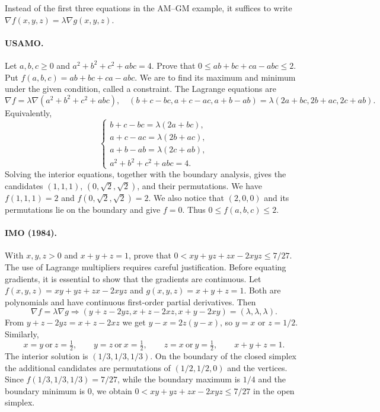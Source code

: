 \documentclass[11pt,a4paper]{article}
\begin{document}
Instead of the first three equations in the AM--GM example, it suffices to write
$\nabla f(x,y,z)=\lambda\nabla g(x,y,z)$.
\paragraph{USAMO.}
Let $a,b,c\geq0$ and $a^2+b^2+c^2+abc=4$. Prove that $0\leq ab+bc+ca-abc\leq2$.
Put $f(a,b,c)=ab+bc+ca-abc$. We are to find its maximum and minimum under the given condition, called a constraint.
The Lagrange equations are
\[
\nabla f=\lambda\nabla(a^2+b^2+c^2+abc),
\quad (b+c-bc,a+c-ac,a+b-ab)=\lambda(2a+bc,2b+ac,2c+ab).
\]
Equivalently,
\[
\begin{cases}
b+c-bc=\lambda(2a+bc),\\
a+c-ac=\lambda(2b+ac),\\
a+b-ab=\lambda(2c+ab),\\
a^2+b^2+c^2+abc=4.
\end{cases}
\]
Solving the interior equations, together with the boundary analysis, gives
the candidates $(1,1,1)$, $(0,\sqrt2,\sqrt2)$, and their permutations.
We have $f(1,1,1)=2$ and $f(0,\sqrt2,\sqrt2)=2$.
We also notice that $(2,0,0)$ and its permutations lie on the boundary and
give $f=0$. Thus $0\leq f(a,b,c)\leq2$.

\paragraph{IMO (1984).}
With $x,y,z>0$ and $x+y+z=1$, prove that
$0<xy+yz+zx-2xyz\leq7/27$.
The use of Lagrange multipliers requires careful justification.
Before equating gradients, it is essential to show that the gradients are continuous.
Let $f(x,y,z)=xy+yz+zx-2xyz$ and $g(x,y,z)=x+y+z=1$.
Both are polynomials and have continuous first-order partial derivatives.
Then
\[
\nabla f=\lambda\nabla g
\Longrightarrow(y+z-2yz,x+z-2xz,x+y-2xy)=(\lambda,\lambda,\lambda).
\]
From $y+z-2yz=x+z-2xz$ we get $y-x=2z(y-x)$, so $y=x$ or $z=1/2$.
Similarly,
\[
x=y\ \text{or}\ z=\tfrac12,\qquad
y=z\ \text{or}\ x=\tfrac12,\qquad
z=x\ \text{or}\ y=\tfrac12,\qquad x+y+z=1.
\]
The interior solution is $(1/3,1/3,1/3)$. On the boundary of the closed
simplex the additional candidates are permutations of $(1/2,1/2,0)$ and
the vertices. Since $f(1/3,1/3,1/3)=7/27$, while the boundary maximum is
$1/4$ and the boundary minimum is $0$, we obtain
$0<xy+yz+zx-2xyz\leq7/27$ in the open simplex.
\end{document}
